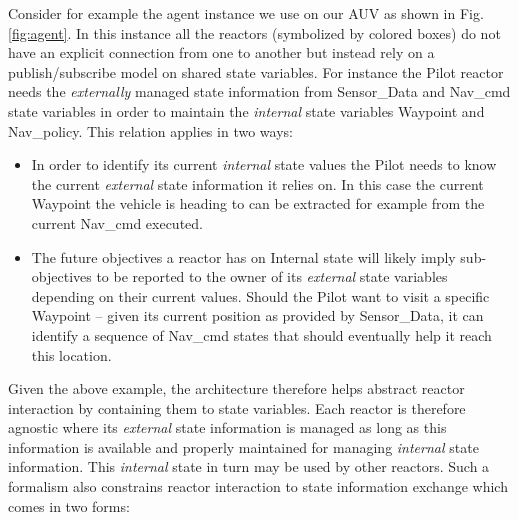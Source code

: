 Consider for example the \rx agent instance we use on our AUV as shown
in Fig. \ref{fig:agent}. In this instance all the reactors (symbolized
by colored boxes) do not have an explicit connection from one to
another but instead rely on a publish/subscribe model on shared state
variables. For instance the \textsf{Pilot} reactor needs the {\em
  externally} managed state information from \textsf{Sensor\_Data} and
\textsf{Nav\_cmd} state variables in order to maintain the
\emph{internal} state variables \textsf{Waypoint} and
\textsf{Nav\_policy}. This relation applies in two ways:

\begin{itemize}

\item In order to identify its current {\em internal} state values the
  \textsf{Pilot}  needs to know the
  current {\em external} state information it relies on. In this case
  the current \textsf{Waypoint} the vehicle is heading to can be
  extracted for example from the current \textsf{Nav\_cmd} executed.

\item The future objectives a reactor has on \textsf{Internal} state
  will likely imply sub-objectives to be reported to the owner of its
  {\em external} state variables depending on their current
  values. Should the \textsf{Pilot} want to visit a specific
  \textsf{Waypoint} -- given its current position as provided by
  \textsf{Sensor\_Data}, it can identify a sequence of
  \textsf{Nav\_cmd} states that should eventually help it reach this
  location. 

\end{itemize}

Given the above example, the \rx architecture therefore helps abstract
reactor interaction by containing them to state variables. Each
reactor is therefore agnostic where its {\em external} state
information is managed as long as this information is available and
properly maintained for managing {\em internal} state
information. This {\em internal} state in turn may be used by other
reactors. Such a formalism also constrains reactor interaction to
state information exchange which comes in two forms:

